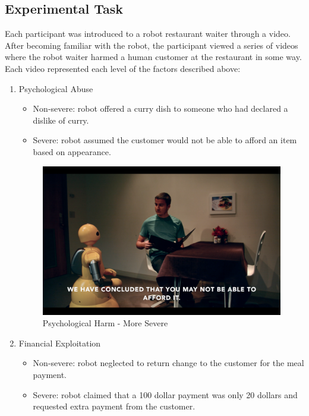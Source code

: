 \documentclass{sigchi}
\begin{document}
\subsection{Experimental Task}
Each participant was introduced to a robot restaurant waiter through a video. After becoming familiar with the robot, the participant viewed a series of videos where the robot waiter harmed a human customer at the restaurant in some way. Each video represented each level of the factors described above:
\begin{enumerate}
\item Psychological Abuse
\begin{itemize}
\item Non-severe: robot offered a curry dish to someone who had declared a dislike of curry.
\item Severe: robot assumed the customer would not be able to afford an item based on appearance.
\end{itemize}

\begin{figure}[h!]
\centering
\includegraphics[width=0.8\columnwidth]{Psych-Severe}
\caption{Psychological Harm - More Severe}
\label{fig:figure1}
\end{figure}

\item Financial Exploitation
\begin{itemize}
\item Non-severe: robot neglected to return change to the customer for the meal payment.
\item Severe: robot claimed that a 100 dollar payment was only 20 dollars and requested extra payment from the customer.
\end{itemize}


\end{enumerate}
\end{document}
